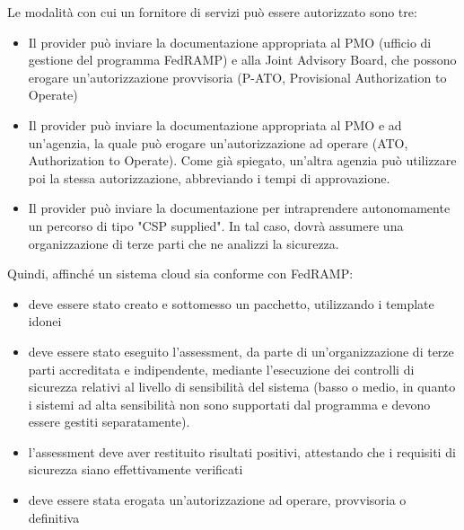 \documentclass[../main.tex]{subfiles}
\begin{document}
Le modalità con cui un fornitore di servizi può essere autorizzato sono tre:
\begin{itemize}
    \item Il provider può inviare la documentazione appropriata al PMO (ufficio di gestione del programma FedRAMP) e alla Joint Advisory Board, che possono erogare un'autorizzazione provvisoria (P-ATO, Provisional Authorization to Operate) 
    \item Il provider può inviare la documentazione appropriata al PMO e ad un'agenzia, la quale può erogare un'autorizzazione ad operare (ATO, Authorization to Operate). Come già spiegato, un'altra agenzia può utilizzare poi la stessa autorizzazione, abbreviando i tempi di approvazione.
    \item Il provider può inviare la documentazione per intraprendere autonomamente un percorso di tipo "CSP supplied". In tal caso, dovrà assumere una organizzazione di terze parti che ne analizzi la sicurezza.
\end{itemize}

Quindi, affinché un sistema cloud sia conforme con FedRAMP:
\begin{itemize}
    \item deve essere stato creato e sottomesso un pacchetto, utilizzando i template idonei
    \item deve essere stato eseguito l'assessment, da parte di un'organizzazione di terze parti accreditata e indipendente, mediante l'esecuzione dei controlli di sicurezza relativi al livello di sensibilità del sistema (basso o medio, in quanto i sistemi ad alta sensibilità non sono supportati dal programma e devono essere gestiti separatamente).
    \item l'assessment deve aver restituito risultati positivi, attestando che i requisiti di sicurezza siano effettivamente verificati
    \item deve essere stata erogata un'autorizzazione ad operare, provvisoria o definitiva
\end{itemize}
\end{document}
